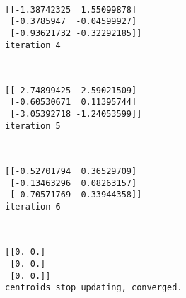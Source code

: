 \documentclass[11pt]{article}
\begin{document}
    \begin{center}
    \end{center}
    { \hspace*{\fill} \\}
    
    \begin{Verbatim}[commandchars=\\\{\}]
[[-1.38742325  1.55099878]
 [-0.3785947  -0.04599927]
 [-0.93621732 -0.32292185]]
iteration 4

    \end{Verbatim}

    \begin{center}
    \end{center}
    { \hspace*{\fill} \\}
    
    \begin{Verbatim}[commandchars=\\\{\}]
[[-2.74899425  2.59021509]
 [-0.60530671  0.11395744]
 [-3.05392718 -1.24053599]]
iteration 5

    \end{Verbatim}

    \begin{center}
    \end{center}
    { \hspace*{\fill} \\}
    
    \begin{Verbatim}[commandchars=\\\{\}]
[[-0.52701794  0.36529709]
 [-0.13463296  0.08263157]
 [-0.70571769 -0.33944358]]
iteration 6

    \end{Verbatim}

    \begin{center}
    \end{center}
    { \hspace*{\fill} \\}
    
    \begin{Verbatim}[commandchars=\\\{\}]
[[0. 0.]
 [0. 0.]
 [0. 0.]]
centroids stop updating, converged.

    \end{Verbatim}


    
    
    
    
\end{document}

